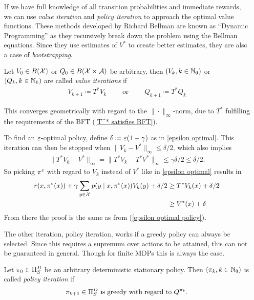If we have full knowledge of all transition probabilities and immediate rewards, we can use \emph{value iteration} and \emph{policy iteration} to approach the optimal value functions. These methods developed by Richard Bellman are known as ``Dynamic Programming'' as they recursively break down the problem using the Bellman equations. Since they use estimates of \(V^*\) to create better estimates, they are also a case of \emph{bootstrapping}.

\begin{definition}Let \(V_0 \in B(\mathcal{X})\) or \(Q_0 \in B(\mathcal{X}\times\mathcal{A})\) be arbitrary, then \((V_k, k\in\mathbb{N}_0)\) or \((Q_k, k\in\mathbb{N}_0)\) are called \emph{value iterations} if
	\begin{align*}
		V_{k+1}\coloneqq T^* V_k \qquad \text{ or }\qquad Q_{k+1}\coloneqq T^* Q_k
	\end{align*}
\end{definition}
This converges geometrically with regard to the \(\|\cdot\|_\infty\)-norm, due to \(T^*\) fulfilling the requirements of the BFT (\ref{T^* satisfies BFT}). 

To find an \(\varepsilon\)-optimal policy, define \(\delta\coloneqq \varepsilon (1-\gamma)\) as in \ref{epsilon optimal}. This iteration can then be stopped when \(\|V_k-V^*\|_\infty\le \delta/2\), which also implies
\begin{align*}
	\|T^* V_k - V^*\|_\infty=\|T^*V_{k} -T^*V^*\|_\infty\le \gamma \delta/2 \le \delta/2.
\end{align*}
So picking \(\pi^\varepsilon\) with regard to \(V_k\) instead of \(V^*\) like in \ref{epsilon optimal} results in
\begin{align*}
	r(x,\pi^\varepsilon(x))+\gamma \sum_{y\in\mathcal{X}}p(y\mid x, \pi^\varepsilon(x))V_k(y) +\delta/2 
	&\ge T^* V_k(x) + \delta/2 \\
	&\ge V^*(x) + \delta
\end{align*}
From there the proof is the same as from (\ref{epsilon optimal policy}).

The other iteration, policy iteration, works if a greedy policy can always be selected. Since this requires a supremum over actions to be attained, this can not be guaranteed in general. Though for finite MDPs this is always the case. 
 
\begin{definition}\label{policy iteration} Let \(\pi_0\in\Pi_S^D\) be an arbitrary deterministic stationary policy. Then
	\((\pi_k,k\in\mathbb{N}_0)\) is called \emph{policy iteration} if
	\[
		\pi_{k+1}\in\Pi_S^D \text{ is greedy with regard to } Q^{\pi_k}.
	\]
\end{definition}

